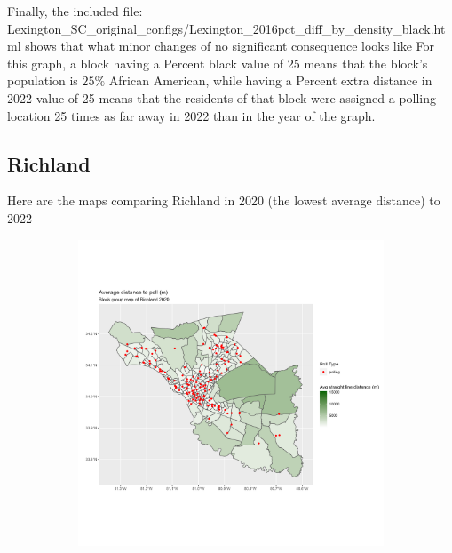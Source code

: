 \documentclass[11pt]{article}
\theoremstyle{remark}
\theoremstyle{definition}
\begin{document}
Finally, the included file: \textrm{Lexington\_SC\_original\_configs/Lexington\_2016pct\_diff\_by\_density\_black.html} shows that what minor changes of no significant consequence looks like  For this graph, a block having a Percent black value of 25 means that the block's population is $25\%$ African American, while having a Percent extra distance in 2022 value of 25 means that the residents of that block were assigned a polling location 25 times as far away in 2022 than in the year of the graph.

\subsection{Richland}
Here are the maps comparing Richland in 2020 (the lowest average distance) to 2022

\begin{figure}
	\begin{subfigure}{.5\textwidth}
		\centering
		\includegraphics[width=\linewidth]{result analysis/Richland_SC_original_configs/distance_map_Richland_config_original_2020_polls.png}
		\label{sfig:York_2020_bg_dist}
	\end{subfigure} 
	\begin{subfigure}{.5\textwidth}
		\centering

\end{subfigure}
\end{figure}
\end{document}
